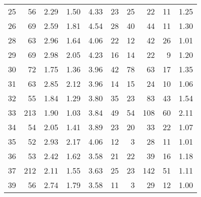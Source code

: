 \begin{tabular}{rrrrrrrrrr}
25 &       56 &           2.29 &           1.50 &          4.33 &              23 &              25 &                    22 &                       11 &       1.25 \\
26 &       69 &           2.59 &           1.81 &          4.54 &              28 &              40 &                    44 &                       11 &       1.30 \\
28 &       63 &           2.96 &           1.64 &          4.06 &              22 &              12 &                    42 &                       26 &       1.01 \\
29 &       69 &           2.98 &           2.05 &          4.23 &              16 &              14 &                    22 &                        9 &       1.20 \\
30 &       72 &           1.75 &           1.36 &          3.96 &              42 &              78 &                    63 &                       17 &       1.35 \\
31 &       63 &           2.85 &           2.12 &          3.96 &              14 &              15 &                    24 &                       10 &       1.06 \\
32 &       55 &           1.84 &           1.29 &          3.80 &              35 &              23 &                    83 &                       43 &       1.54 \\
33 &      213 &           1.90 &           1.03 &          3.84 &              49 &              54 &                   108 &                       60 &       2.11 \\
34 &       54 &           2.05 &           1.41 &          3.89 &              23 &              20 &                    33 &                       22 &       1.07 \\
35 &       52 &           2.93 &           2.17 &          4.06 &              12 &               3 &                    28 &                       11 &       1.01 \\
36 &       53 &           2.42 &           1.62 &          3.58 &              21 &              22 &                    39 &                       16 &       1.18 \\
37 &      212 &           2.11 &           1.55 &          3.63 &              25 &              23 &                   142 &                       51 &       1.11 \\
39 &       56 &           2.74 &           1.79 &          3.58 &              11 &               3 &                    29 &                       12 &       1.00 \\

\end{tabular}
